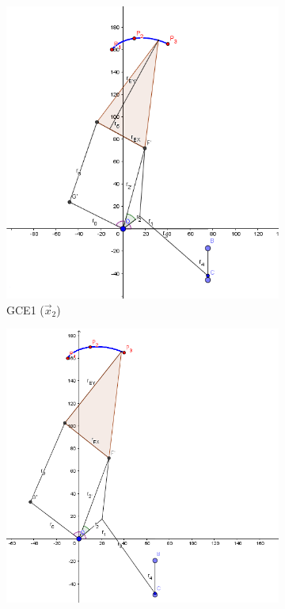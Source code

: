 \begin{figure}
\begin{subfigure}[b]{0.45\linewidth}
	\includegraphics[width=\linewidth]{Figures/GCE1_2}
	\caption{GCE1  ($\vec{x}_2$)} \label{fig:G1} 
\end{subfigure}
	\begin{subfigure}[b]{0.49\linewidth}
		\includegraphics[width=\textwidth]{Figures/GCE2}

\end{subfigure}
\end{figure}
